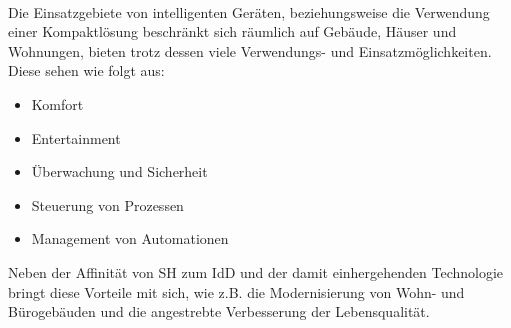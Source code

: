     \\ 
    \linebreak
    Die Einsatzgebiete von intelligenten Geräten, beziehungsweise die Verwendung einer Kompaktlösung beschränkt sich räumlich 
    auf Gebäude, Häuser und Wohnungen, bieten trotz dessen viele Verwendungs- und Einsatzmöglichkeiten. Diese sehen wie folgt aus: 
    \begin{itemize}
        \item Komfort
        \item Entertainment
        \item Überwachung und Sicherheit
        \item Steuerung von Prozessen
        \item Management von Automationen
    \end{itemize}    
    Neben der Affinität von \acl{SH} zum \acl{IdD} und der damit einhergehenden Technologie bringt diese Vorteile mit sich, wie z.B. 
    die Modernisierung von Wohn- und Bürogebäuden und die angestrebte Verbesserung der Lebensqualität. 


